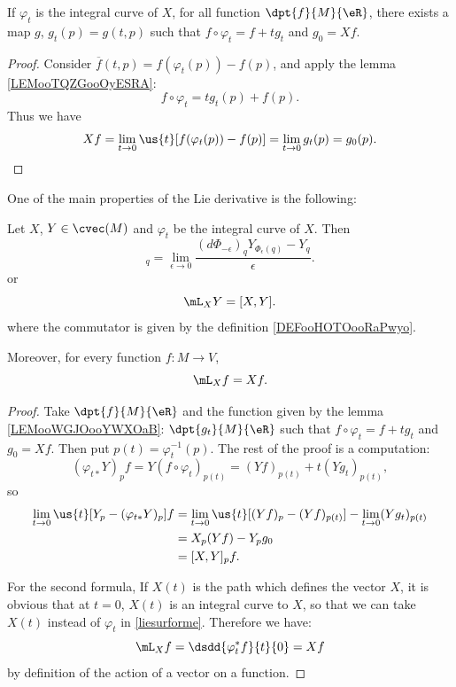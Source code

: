 \begin{lemma}		\label{LEMooWGJOooYWXOaB}
	If $\varphi_t$ is the integral curve of $X$, for all function $\dpt{f}{M}{\eR}$, there exists a map $g$, $g_t(p)=g(t,p)$ such that
	$f\circ\varphi_t=f+tg_t$ and $g_0=Xf$.
\end{lemma}

\begin{proof}
	Consider $\overline{f}(t,p)=f(\varphi_t(p))-f(p)$, and apply the lemma \ref{LEMooTQZGooOyESRA}:
	\[
		f\circ\varphi_t=tg_t(p)+f(p).
	\]
	Thus we have
	\[
		Xf=\lim_{t\to 0}\us{t}[f(\varphi_t(p))-f(p)]=\lim_{t\to 0}g_t(p)=g_0(p).
	\]
\end{proof}

One of the main properties of the Lie derivative is the following:
\begin{theorem}		\label{ThoLieDerrComm}
	Let $X$, $Y\in\cvec(M)$ and $\varphi_t$ be the integral curve of $X$. Then
	\begin{equation}
		[X,Y]_q=\lim_{\epsilon\to 0}\frac{ (d\Phi_{-\epsilon})_qY_{\Phi_{\epsilon}(q)}-Y_q }{ \epsilon }.
	\end{equation}
	or
	\begin{equation}
		\mL_XY=[X,Y].
	\end{equation}
	where the commutator is given by the definition \ref{DEFooHOTOooRaPwyo}.

	Moreover, for every function $f\colon M\to V$,
	\begin{equation}
		\mL_Xf=Xf.
	\end{equation}
\end{theorem}

\begin{proof}
	Take $\dpt{f}{M}{\eR}$ and the function given by the lemma \ref{LEMooWGJOooYWXOaB}: $\dpt{g_t}{M}{\eR}$ such that $f\circ \varphi_t=f+tg_t$ and $g_0=Xf$. Then put $p(t)=\varphi_t^{-1}(p)$. The rest of the proof is a computation:
	\[
		(\varphi_{t*}Y)_pf=Y(f\circ\varphi_t)_{p(t)}=(Yf)_{p(t)}+t(Yg_t)_{p(t)},
	\]
	so
	\begin{equation}
		\begin{split}
			\lim_{t\to 0}\us{t}[Y_p-(\varphi_{t*}Y)_p]f & =\lim_{t\to 0}\us{t}[(Yf)_p-(Yf)_{p(t)}]-\lim_{t\to 0}(Yg_t)_{p(t)} \\
			                                            & =X_p(Yf)-Y_pg_0                                                     \\
			                                            & =[X,Y]_pf.
		\end{split}
	\end{equation}

	For the second formula,
	If $X(t)$ is the path which defines the vector $X$, it is obvious that at $t=0$, $X(t)$ is an integral curve to $X$, so that we can take $X(t)$ instead of $\varphi_t$ in \eqref{liesurforme}. Therefore we have:
	\begin{equation}
		\mL_Xf=\dsdd{\varphi_t^*f}{t}{0}
		=Xf
	\end{equation}
	by definition of the action of a vector on a function.
\end{proof}

